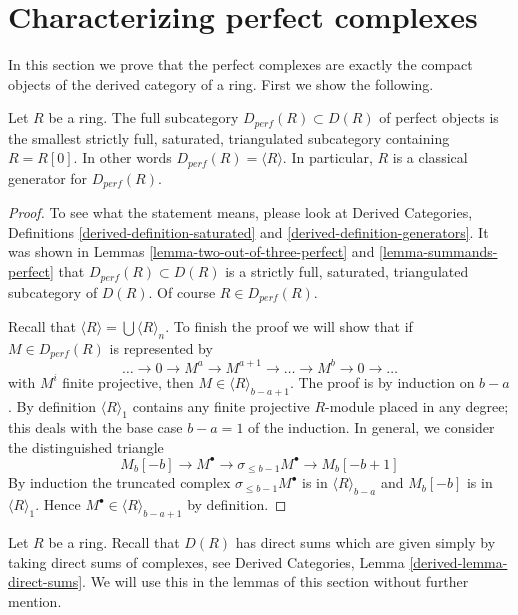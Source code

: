 \section{Characterizing perfect complexes}
\label{section-perfect-compact}

\noindent
In this section we prove that the perfect complexes are exactly the
compact objects of the derived category of a ring. First we show
the following.

\begin{lemma}
\label{lemma-perfect-ring-classical-generator}
Let $R$ be a ring. The full subcategory $D_{perf}(R) \subset D(R)$ of perfect
objects is the smallest strictly full, saturated, triangulated subcategory
containing $R = R[0]$. In other words $D_{perf}(R) = \langle R \rangle$.
In particular, $R$ is a classical generator for $D_{perf}(R)$.
\end{lemma}

\begin{proof}
To see what the statement means, please look at
Derived Categories, Definitions \ref{derived-definition-saturated} and
\ref{derived-definition-generators}.
It was shown in Lemmas \ref{lemma-two-out-of-three-perfect} and
\ref{lemma-summands-perfect} that $D_{perf}(R) \subset D(R)$
is a strictly full, saturated, triangulated subcategory of $D(R)$.
Of course $R \in D_{perf}(R)$.

\medskip\noindent
Recall that $\langle R \rangle = \bigcup \langle R \rangle_n$.
To finish the proof we will show that if $M \in D_{perf}(R)$
is represented by
$$
\ldots \to 0 \to M^a \to M^{a + 1} \to \ldots \to M^b \to 0 \to \ldots
$$
with $M^i$ finite projective, then $M \in \langle R \rangle_{b - a + 1}$.
The proof is by induction on $b - a$.
By definition $\langle R \rangle_1$ contains any finite projective
$R$-module placed in any degree; this deals with the base case
$b - a = 1$ of the induction. In general, we consider the distinguished
triangle
$$
M_b[-b] \to M^\bullet \to \sigma_{\leq b - 1}M^\bullet \to M_b[-b + 1]
$$
By induction the truncated complex $\sigma_{\leq b - 1}M^\bullet$ is
in $\langle R \rangle_{b - a}$ and $M_b[-b]$ is in $\langle R \rangle_1$.
Hence $M^\bullet \in \langle R \rangle_{b - a + 1}$ by definition.
\end{proof}

\noindent
Let $R$ be a ring. Recall that $D(R)$ has direct sums which are given
simply by taking direct sums of complexes, see
Derived Categories, Lemma \ref{derived-lemma-direct-sums}.
We will use this in the lemmas of this section without further mention. 

